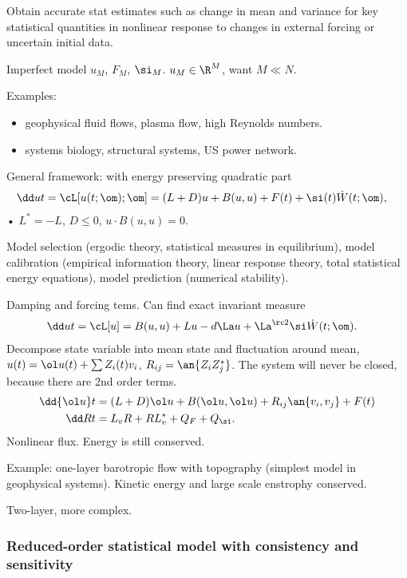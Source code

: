 Obtain accurate stat estimates such as change in mean and variance for key statistical quantities in nonlinear response to changes in external forcing or uncertain initial data.

Imperfect model $u_M$, $F_M$, $\si_M$. $u_M\in \R^M$, want $M\ll N$.

Examples: 
\begin{itemize}
\item
geophysical fluid flows, plasma flow,
high Reynolds numbers.
\item
systems biology, structural systems, US power network.
\end{itemize}

General framework: with energy preserving quadratic part
\begin{align}
\dd ut &=\cL[u(t;\om);\om] = (L+D)u+B(u,u) + F(t)+\si(t)\dot W(t;\om),
\end{align}•
$L^*=-L$, $D\le 0$, $u\cdot B(u,u)=0$.

Model selection (ergodic theory, statistical measures in equilibrium), model calibration (empirical information theory, linear response theory, total statistical energy equations), model prediction (numerical stability).

Damping and forcing tems. Can find exact invariant measure
\begin{align}
\dd ut &= \cL[u] = B(u,u)+Lu-d\La u + \La^{\rc 2}\si \dot W(t;\om).
\end{align}
Decompose state variable into mean state and fluctuation around mean, $u(t) = \ol u(t) + \sum Z_i(t)v_i$, $R_{ij}=\an{Z_iZ_j^*}$.
The system will never be closed, because there are 2nd order terms.
\begin{align}
\dd{\ol u}t &=(L+D)\ol u + B(\ol u,\ol u) + R_{ij}\an{v_i,v_j}+F(t)\\
\dd Rt &=L_vR+RL_v^*+Q_F+Q_\si.
\end{align}
Nonlinear flux. Energy is still conserved.

Example: one-layer barotropic flow with topography (simplest model in geophysical systems). Kinetic energy and large scale enstrophy conserved.

Two-layer, more complex.

\subsubsection{Reduced-order statistical model with consistency and sensitivity}

